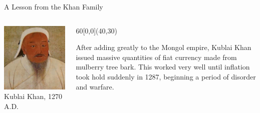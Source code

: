 \begin{frame}{A Lesson from the Khan Family}
    \begin{columns}[onlytextwidth]
            \centering
            \includegraphics[height=0.75\textheight]{img/khan.jpg} \\
            Kublai Khan, 1270 A.D.

        \begin{textblock}{60}[0,0](40,30)
            \begin{varblock}[0.9\textwidth]{}%
            After adding greatly to the Mongol empire, Kublai Khan issued
            massive quantities of fiat currency made from mulberry tree bark.
            This worked very well until inflation took hold suddenly in 1287,
            beginning a period of disorder and warfare.
            \end{varblock}
        \end{textblock}
    \end{columns}
\end{frame}

